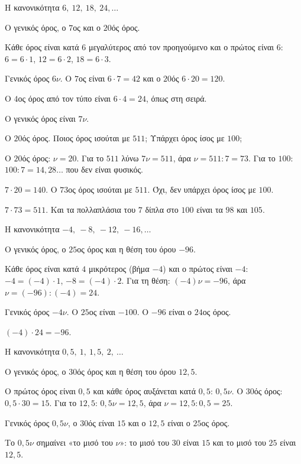 
\tixero Η κανονικότητα $6,\ 12,\ 18,\ 24,\dots$\par
\tithelo Ο γενικός όρος, ο $7$ος και ο $20$ός όρος.\par
\possindeo Κάθε όρος είναι κατά $6$ μεγαλύτερος από τον προηγούμενο και ο πρώτος είναι $6$: $6=6\cdot1$, $12=6\cdot2$, $18=6\cdot3$.\par
\apantisi Γενικός όρος $6\nu$. Ο $7$ος είναι $6\cdot7=42$ και ο $20$ός $6\cdot20=120$.\par
\elegxos Ο $4$ος όρος από τον τύπο είναι $6\cdot4=24$, όπως στη σειρά.

\tixero Ο γενικός όρος είναι $7\nu$.\par
\tithelo Ο $20$ός όρος. Ποιος όρος ισούται με $511$; Υπάρχει όρος ίσος με $100$;\par
\possindeo Ο $20$ός όρος: $\nu=20$. Για το $511$ λύνω $7\nu=511$, άρα $\nu=511:7=73$. Για το $100$: $100:7=14{,}28\ldots$ που δεν είναι φυσικός.\par
\apantisi $7\cdot20=140$. Ο $73$ος όρος ισούται με $511$. Όχι, δεν υπάρχει όρος ίσος με $100$.\par
\elegxos $7\cdot73=511$. Και τα πολλαπλάσια του $7$ δίπλα στο $100$ είναι τα $98$ και $105$.

\tixero Η κανονικότητα $-4,\ -8,\ -12,\ -16,\dots$\par
\tithelo Ο γενικός όρος, ο $25$ος όρος και η θέση του όρου $-96$.\par
\possindeo Κάθε όρος είναι κατά $4$ μικρότερος (βήμα $-4$) και ο πρώτος είναι $-4$: $-4=(-4)\cdot1$, $-8=(-4)\cdot2$. Για τη θέση: $(-4)\nu=-96$, άρα $\nu=(-96):(-4)=24$.\par
\apantisi Γενικός όρος $-4\nu$. Ο $25$ος είναι $-100$. Ο $-96$ είναι ο $24$ος όρος.\par
\elegxos $(-4)\cdot24=-96$.

\tixero Η κανονικότητα $0{,}5,\ 1,\ 1{,}5,\ 2,\ \ldots$\par
\tithelo Ο γενικός όρος, ο $30$ός όρος και η θέση του όρου $12{,}5$.\par
\possindeo Ο πρώτος όρος είναι $0{,}5$ και κάθε όρος αυξάνεται κατά $0{,}5$: $0{,}5\nu$. Ο $30$ός όρος: $0{,}5\cdot30=15$. Για το $12{,}5$: $0{,}5\nu=12{,}5$, άρα $\nu=12{,}5:0{,}5=25$.\par
\apantisi Γενικός όρος $0{,}5\nu$, ο $30$ός είναι $15$ και ο $12{,}5$ είναι ο $25$ος όρος.\par
\elegxos Το $0{,}5\nu$ σημαίνει «το μισό του $\nu$»: το μισό του $30$ είναι $15$ και το μισό του $25$ είναι $12{,}5$.

